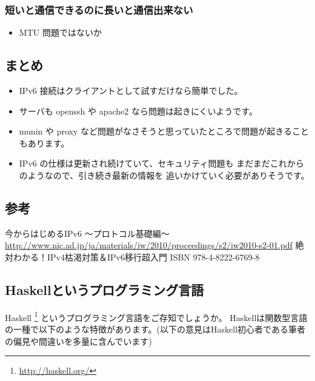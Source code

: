 \documentclass[mingoth,a4paper]{jsarticle}
\begin{document}
\subsubsection{短いと通信できるのに長いと通信出来ない}

\begin{itemize}
\item MTU 問題ではないか
\end{itemize}
\subsection{まとめ}

\begin{itemize}
\item IPv6 接続はクライアントとして試すだけなら簡単でした。
\item サーバも openssh や apache2 なら問題は起きにくいようです。
\item munin や proxy など問題がなさそうと思っていたところで問題が起きることもあります。
\item IPv6 の仕様は更新され続けていて、セキュリティ問題も
  まだまだこれからのようなので、引き続き最新の情報を
  追いかけていく必要がありそうです。
\end{itemize}
\subsection{参考}

\begin{thebibliography}{0}
  今からはじめるIPv6 〜プロトコル基礎編〜 \url{http://www.nic.ad.jp/ja/materials/iw/2010/proceedings/s2/iw2010-s2-01.pdf}
  絶対わかる！IPv4枯渇対策＆IPv6移行超入門 ISBN 978-4-8222-6769-8
\end{thebibliography}


\subsection{Haskellというプログラミング言語}

Haskell \footnote{\url{http://haskell.org/}}
というプログラミング言語をご存知でしょうか。
Haskellは関数型言語の一種で以下のような特徴があります。(以下の意見はHaskell初心者である筆者の偏見や間違いを多量に含んでいます)
\end{document}
